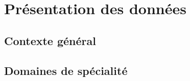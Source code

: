 \section{Présentation des données}
  \subsection{Contexte général}
    

  \subsection{Domaines de spécialité}
    
